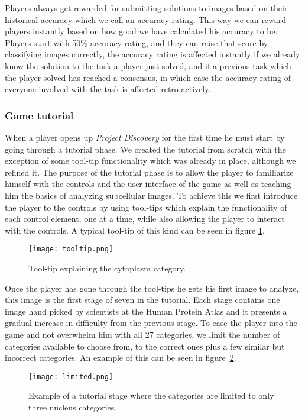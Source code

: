 Players always get rewarded for submitting solutions to images based on their historical accuracy which we call an accuracy rating. This way we can reward players instantly based on how good we have calculated his accuracy to be. Players start with 50\% accuracy rating, and they can raise that score by classifying images correctly, the accuracy rating is affected instantly if we already know the solution to the task a player just solved, and if a previous task which the player solved has reached a consensus, in which case the accuracy rating of everyone involved with the task is affected retro-actively.

\subsubsection{Game tutorial}
When a player opens up \emph{Project Discovery} for the first time he must start by going through a tutorial phase. We created the tutorial from scratch with the exception of some tool-tip functionality which was already in place, although we refined it. The purpose of the tutorial phase is to allow the player to familiarize himself with the controls and the user interface of the game as well as teaching him the basics of analyzing subcellular images. To achieve this we first introduce the player to the controls by using tool-tips which explain the functionality of each control element, one at a time, while also allowing the player to interact with the controls. A typical tool-tip of this kind can be seen in figure \ref{fig:tooltip}.

\begin{figure}[H]
\centering
\graphicspath{ {./graphics/} }
\centerline{\texttt{[image: tooltip.png]}}
\caption{\label{fig:tooltip}Tool-tip explaining the cytoplasm category.}
\end{figure}

Once the player has gone through the tool-tips he gets his first image to analyze, this image is the first stage of seven in the tutorial. Each stage contains one image hand picked by scientists at the Human Protein Atlas and it presents a gradual increase in difficulty from the previous stage. To ease the player into the game and not overwhelm him with all 27 categories, we limit the number of categories available to choose from, to the correct ones plus a few similar but incorrect categories. An example of this can be seen in figure~\ref{fig:limited}.

\begin{figure}[H]
\centering
\graphicspath{ {./graphics/} }
\centerline{\texttt{[image: limited.png]}}
\caption{\label{fig:limited}Example of a tutorial stage where the categories are limited to only three nucleus categories.}
\end{figure}

